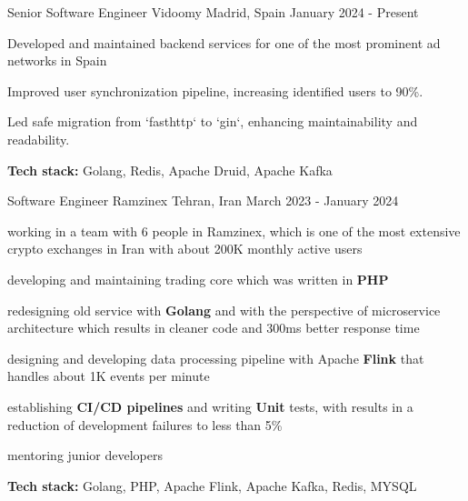 

\begin{cventries}


  \cventry
    {Senior Software Engineer} %
    {Vidoomy} %
    {Madrid, Spain} %
    {January 2024 - Present} %
    {
      \begin{cvitems} %
        \item Developed and maintained backend services for one of the most prominent ad networks in Spain
        \item Improved user synchronization pipeline, increasing identified users to 90\%.
        \item Led safe migration from `fasthttp` to `gin`, enhancing maintainability and readability.
        \item \textbf{Tech stack:} Golang, Redis, Apache Druid, Apache Kafka
      \end{cvitems}
    }

    
  \cventry
    {Software Engineer} %
    {Ramzinex} %
    {Tehran, Iran} %
    {March 2023 - January 2024} %
    {
      \begin{cvitems} %
        \item working in a team with 6 people in Ramzinex, which is one of the most extensive crypto exchanges in Iran with about 200K monthly active users
        \item developing and maintaining trading core which was written in \textbf{PHP}
        \item redesigning old service with \textbf{Golang} and with the perspective of microservice architecture which results in cleaner code and 300ms better response time
        \item designing and developing data processing pipeline with Apache \textbf{Flink} that handles about 1K events per minute
        \item establishing \textbf{CI/CD pipelines} and writing \textbf{Unit} tests, with results in a reduction of development failures to less than 5\%
        \item mentoring junior developers
        \item \textbf{Tech stack:} Golang, PHP, Apache Flink, Apache Kafka, Redis, MYSQL
      \end{cvitems}
    }


\end{cventries}
